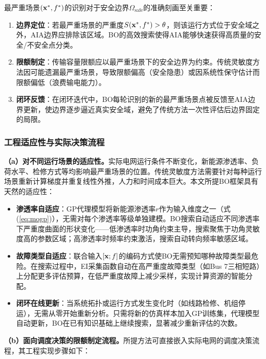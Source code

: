 最严重场景$(\mathbf{x}^*, f^*)$的识别对于安全边界$\Omega_{\text{safe}}$的准确刻画至关重要：

\begin{enumerate}
    \item \textbf{边界定位}：若最严重场景的严重度$S(\mathbf{x}^*, f^*) > \theta$，则该运行方式位于安全域之外，AIA边界应排除该区域。BO的高效搜索使得AIA能够快速获得高质量的安全/不安全点分类。

    \item \textbf{限额制定}：传输容量限额应以最严重场景下的安全边界为约束。传统灵敏度方法因可能遗漏最严重场景，导致限额偏高（安全隐患）或因系统性保守估计而限额偏低（浪费输电能力）。

    \item \textbf{闭环反馈}：在闭环迭代中，BO每轮识别的新的最严重场景点被反馈至AIA边界更新，使边界逐步逼近真实安全域，避免了传统方法一次性评估后边界固定的局限。
\end{enumerate}

\subsubsection{工程适应性与实际决策流程}

\textbf{（a）对不同运行场景的适应性。}实际电网运行条件不断变化，新能源渗透率、负荷水平、检修方式等均影响最严重场景的位置。传统灵敏度方法需要针对每种运行场景重新计算梯度并重复线性外推，人力和时间成本巨大。本文所提BO框架具有天然的适应性：

\begin{itemize}
    \item \textbf{渗透率自适应}：GP代理模型将新能源渗透率$r$作为输入维度之一（式(\ref{eq:mogp})），无需对每个渗透率等级单独建模。BO搜索自动适应不同渗透率下严重度曲面的形状变化——低渗透率时功角约束主导，搜索聚焦于功角灵敏度高的参数区域；高渗透率时频率约束激活，搜索自动转向频率敏感区域。
    \item \textbf{故障类型自适应}：联合输入$[\mathbf{x}; f]$的编码方式使BO无需预知哪种故障类型最危险。在搜索过程中，EI采集函数自动在高严重度故障类型（如Bus 7三相短路）上分配更多评估预算，在低严重度故障上减少采样，实现计算资源的智能分配。
    \item \textbf{闭环在线更新}：当系统拓扑或运行方式发生变化时（如线路检修、机组停运），无需从零开始重新分析。只需将新的仿真样本加入GP训练集，代理模型自动更新，BO在已有知识基础上继续搜索，显著减少重新评估的次数。
\end{itemize}

\textbf{（b）面向调度决策的限额制定流程。}所提方法可直接嵌入实际电网的调度决策流程，其工程实现步骤如下：

